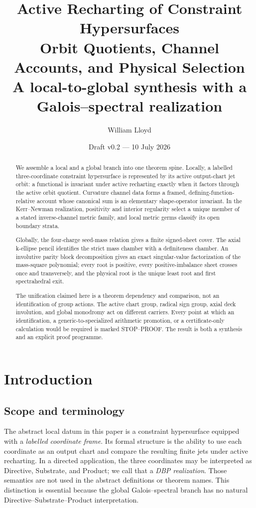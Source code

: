 \documentclass[11pt]{article}
\title{\textbf{Active Recharting of Constraint Hypersurfaces}\\
\large Orbit Quotients, Channel Accounts, and Physical Selection\\[4pt]
\large A local-to-global synthesis with a Galois--spectral realization}
\author{William Lloyd}
\date{Draft v0.2 --- 10 July 2026}
\theoremstyle{remark}
\begin{document}
\maketitle

\begin{abstract}
We assemble a local and a global branch into one theorem spine. Locally, a
labelled three-coordinate constraint hypersurface is represented by its active
output-chart jet orbit: a functional is invariant under active recharting
exactly when it factors through the active orbit quotient. Curvature channel
data forms a framed, defining-function-relative account whose canonical sum
is an elementary shape-operator invariant. In the Kerr--Newman realization,
positivity and interior regularity select a unique member of a stated
inverse-channel metric family, and local metric germs classify its open
boundary strata.

Globally, the four-charge seed-mass relation gives a finite signed-sheet
cover. The axial k-ellipse pencil identifies the strict mass chamber with a
definiteness chamber. An involutive parity block decomposition gives an exact
singular-value factorization of the mass-square polynomial; every root is
positive, every positive-imbalance sheet crosses once and transversely, and
the physical root is the unique least root and first spectrahedral exit.

The unification claimed here is a theorem dependency and comparison, not an
identification of group actions. The active chart group, radical sign group,
axial deck involution, and global monodromy act on different carriers. Every
point at which an identification, a generic-to-specialized arithmetic
promotion, or a certificate-only calculation would be required is marked
STOP--PROOF. The result is both a synthesis and an explicit proof programme.
\end{abstract}

\tableofcontents

\section{Introduction}

\subsection{Scope and terminology}

The abstract local datum in this paper is a constraint hypersurface equipped
with a \emph{labelled coordinate frame}. Its formal structure is the ability
to use each coordinate as an output chart and compare the resulting finite
jets under active recharting. In a directed application, the three coordinates
may be interpreted as Directive, Substrate, and Product; we call that a
\emph{DBP realization}. Those semantics are not used in the abstract
definitions or theorem names. This distinction is essential because the global
Galois--spectral branch has no natural Directive--Substrate--Product
interpretation.
\end{document}

